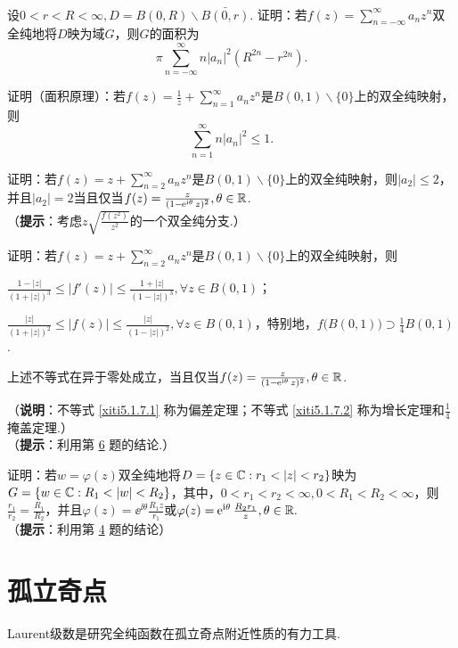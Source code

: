 \begin{xiti}
\begin{align*}
      \end{align*}
  \item \hypertarget{xiti5.1.4}{} 设$0<r<R<\infty,D=B(0,R)\backslash\bar{B(0,r)}$. 证明：若$f(z)=\sum_{n=-\infty}^\infty a_nz^n$双全纯地将$D$映为域$G$，则$G$的面积为
      \[
        \pi\sum_{n=-\infty}^\infty n|a_n|^2(R^{2n}-r^{2n}).
      \]
  \item 证明（面积原理）：若$f(z)=\frac1z+\sum_{n=1}^\infty a_nz^n$是$B(0,1)\backslash\{0\}$上的双全纯映射，则
      \[
        \sum_{n=1}^\infty n |a_n|^2 \le1.
      \]
  \item \hypertarget{xiti5.1.6}{} 证明：若$f(z)=z+\sum_{n=2}^\infty a_nz^n$是$B(0,1)\backslash\{0\}$上的双全纯映射，则$|a_2|\le2$，并且$|a_2|=2$当且仅当$f(z)=\frac z{(1-\operatorname{\!\!\;\mathrm e}^{\mathrm i\theta}z)^2},\theta\in\mathbb R$.\\
     （\textbf{提示}：考虑$z\sqrt{\frac{f(z^2)}{z^2}}$的一个双全纯分支.）
  \item 证明：若$f(z)=z+\sum_{n=2}^\infty a_nz^n$是$B(0,1)\backslash\{0\}$上的双全纯映射，则
      \begin{enuma}
        \item \label{xiti5.1.7.1}$\frac{1-|z|}{(1+|z|)^3}\le|f'(z)|\le\frac{1+|z|}{(1-|z|)^3},\forall z\in B(0,1)$；
        \item \label{xiti5.1.7.2}$\frac{|z|}{(1+|z|)^2}\le|f(z)|\le\frac{|z|}{(1-|z|)^2},\forall z\in B(0,1)$，特别地，$f\big(B(0,1)\big)\supset \frac14B(0,1)$.
        \item 上述不等式在异于零处成立，当且仅当$f(z)=\frac z{(1-\operatorname{\!\!\;\mathrm e}^{\mathrm i\theta}z)^2},\theta\in\mathbb R$.
      \end{enuma}
      （\textbf{说明}：不等式 \ref{xiti5.1.7.1} 称为偏差定理；不等式 \ref{xiti5.1.7.2} 称为增长定理和$\frac14$掩盖定理.）\\
      （\textbf{提示}：利用第 \hyperlink{xiti5.1.6}{6} 题的结论.）
  \item 证明：若$w=\varphi(z)$双全纯地将$D=\{z\in\MC:r_1<|z|<r_2\}$映为$G=\{w\in\MC:
      R_1<|w|<R_2\}$，其中，$0<r_1<r_2<\infty,0<R_1<R_2<\infty$，则$\frac{r_1}{r_2}=\frac{R_1}{R_2}$，并且$\varphi(z)=\ee^{\ii\theta}\frac{R_1z}{r_1}$或$\varphi(z)=\operatorname{\!\!\;\mathrm e}^{\mathrm i\theta}\frac{R_2r_1}z,\theta\in\mathbb R.$\\
      （\textbf{提示}：利用第 \hyperlink{xiti5.1.4}{4} 题的结论）
\end{xiti}

\section{孤立奇点\label{sec5.2}}
Laurent级数是研究全纯函数在孤立奇点附近性质的有力工具.

